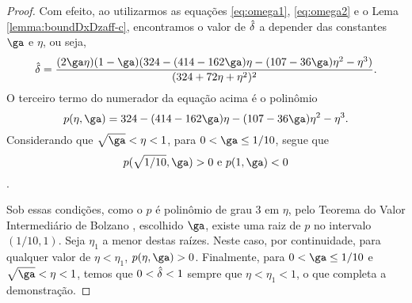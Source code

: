 \begin{proof}
	Com efeito, ao utilizarmos as equações \eqref{eq:omega1}, \eqref{eq:omega2} e o Lema \ref{lemma:boundDxDzaff-c}, encontramos o valor de $\hat{\delta}$ a depender das constantes $\ga$ e $\eta$, ou seja, 
	\begin{equation}
		\label{eq:nextdel-full}
		\nextdel = \frac{(2\ga\eta)(1-\ga)(324 -	(414 - 162\ga)\eta - (107 - 36\ga)\eta^{2} -  \eta^{3})}{(324 + 72\eta + \eta^{2})^{2}}.
	\end{equation}
	O terceiro termo do numerador da equação acima é o polinômio 
	\[
		p(\eta,\ga) =   324 -	(414 - 162\ga)\eta - (107 - 36\ga)\eta^{2} -  \eta^{3}. 
	\]
	Considerando que  $\sqrt{\ga}<\eta<1$, para $0 < \ga \leq 1/10$, segue que
	\[p(\sqrt{1/10},\ga) >0 \text{ e  } p(1,\ga) <0\].

	Sob essas condições, como o $p$ é polinômio de grau 3 em $\eta$, pelo Teorema do Valor Intermediário de Bolzano \cite[Teorema 5.3.7]{Bartle:2011tr}, escolhido $\ga$, existe uma  raiz  de $p$ no intervalo $(1/10,1)$. Seja $\eta_{1}$ a menor destas raízes. Neste caso, por continuidade, para qualquer valor de $\eta  < \eta_{1}$, $p(\eta,\ga) >0$.  Finalmente,  para $0 < \ga \leq 1/10$ e  $\sqrt{\ga}<\eta<1$, temos que  $0<\hat{\delta}<1$  sempre que $\eta < \eta_{1} < 1$, o que completa a demonstração.
\end{proof}




	


